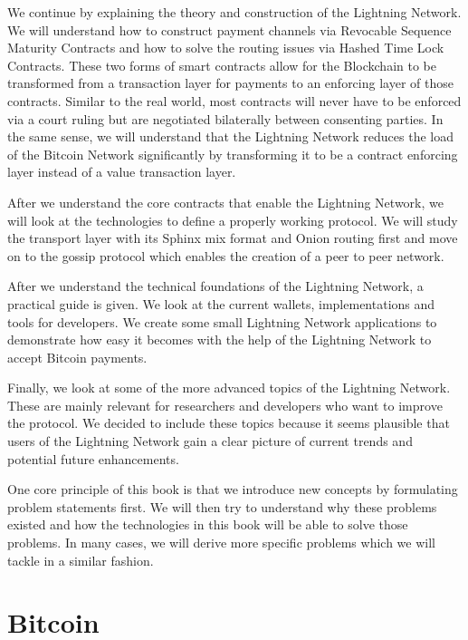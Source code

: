 \documentclass[a4paper,12pt,oneside,openany]{book}
\begin{document}
We continue by explaining the theory and construction of the Lightning Network.
We will understand how to construct payment channels via Revocable Sequence Maturity Contracts and how to solve the routing issues via Hashed Time Lock Contracts.
These two forms of smart contracts allow for the Blockchain to be transformed from a transaction layer for payments to an enforcing layer of those contracts.
Similar to the real world, most contracts will never have to be enforced via a court ruling but are negotiated bilaterally between consenting parties.
In the same sense, we will understand that the Lightning Network reduces the load of the Bitcoin Network significantly by transforming it to be a contract enforcing layer instead of a value transaction layer.

After we understand the core contracts that enable the Lightning Network, we will look at the technologies to define a properly working protocol.
We will study the transport layer with its Sphinx mix format and Onion routing first and move on to the gossip protocol which enables the creation of a peer to peer network.

After we understand the technical foundations of the Lightning Network, a practical guide is given.
We look at the current wallets, implementations and tools for developers.
We create some small Lightning Network applications to demonstrate how easy it becomes with the help of the Lightning Network to accept Bitcoin payments.

Finally, we look at some of the more advanced topics of the Lightning Network.
These are mainly relevant for researchers and developers who want to improve the protocol.
We decided to include these topics because it seems plausible that users of the Lightning Network gain a clear picture of current trends and potential future enhancements. 

One core principle of this book is that we introduce new concepts by formulating problem statements first. We will then try to understand why these problems existed and how the technologies in this book will be able to solve those problems. In many cases, we will derive more specific problems which we will tackle in a similar fashion.

\chapter{Bitcoin}
\end{document}
